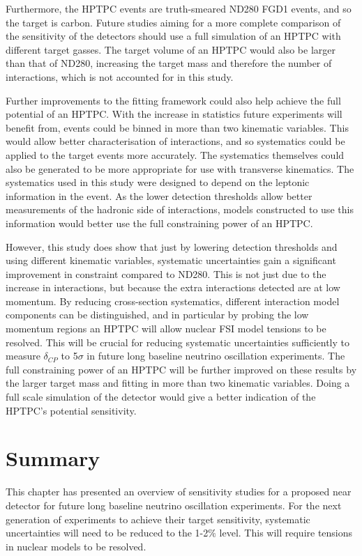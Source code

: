 Furthermore, the HPTPC events are truth-smeared ND280 FGD1 events, and so the target is carbon. Future studies aiming for a more complete comparison of the sensitivity of the detectors should use a full simulation of an HPTPC with different target gasses. The target volume of an HPTPC would also be larger than that of ND280, increasing the target mass and therefore the number of interactions, which is not accounted for in this study. 

Further improvements to the fitting framework could also help achieve the full potential of an HPTPC. With the increase in statistics future experiments will benefit from, events could be binned in more than two kinematic variables. This would allow better characterisation of interactions, and so systematics could be applied to the target events more accurately. The systematics themselves could also be generated to be more appropriate for use with transverse kinematics. The systematics used in this study were designed to depend on the leptonic information in the event. As the lower detection thresholds allow better measurements of the hadronic side of interactions, models constructed to use this information would better use the full constraining power of an HPTPC.

However, this study does show that just by lowering detection thresholds and using different kinematic variables, systematic uncertainties gain a significant improvement in constraint compared to ND280. This is not just due to the increase in interactions, but because the extra interactions detected are at low momentum. By reducing cross-section systematics, different interaction model components can be distinguished, and in particular by probing the low momentum regions an HPTPC will allow nuclear FSI model tensions to be resolved. This will be crucial for reducing systematic uncertainties sufficiently to measure $\delta_{CP}$ to 5$\sigma$ in future long baseline neutrino oscillation experiments. The full constraining power of an HPTPC will be further improved on these results by the larger target mass and fitting in more than two kinematic variables. Doing a full scale simulation of the detector would give a better indication of the HPTPC's potential sensitivity.

\section{Summary}

This chapter has presented an overview of sensitivity studies for a proposed near detector for future long baseline neutrino oscillation experiments. For the next generation of experiments to achieve their target sensitivity, systematic uncertainties will need to be reduced to the 1-2$\%$ level. This will require tensions in nuclear models to be resolved.

